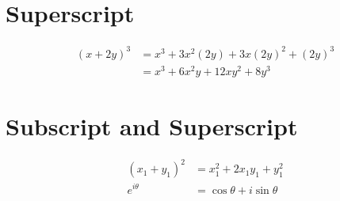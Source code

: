 \documentclass{article}
\begin{document}
\section{Superscript}

\begin{align}
(x + 2y)^3 &= x^3 + 3x^2(2y) + 3x(2y)^2 +(2y)^3\\
           &= x^3 + 6x^2y + 12xy^2 +8y^3
\end{align}

\section{Subscript and Superscript}

\begin{align}
(x_1 + y_1)^2 &= x_1^2 + 2x_1y_1 + y_1^2\\
e^{i\theta}&=\cos \theta + i\sin \theta
\end{align}
\end{document}
